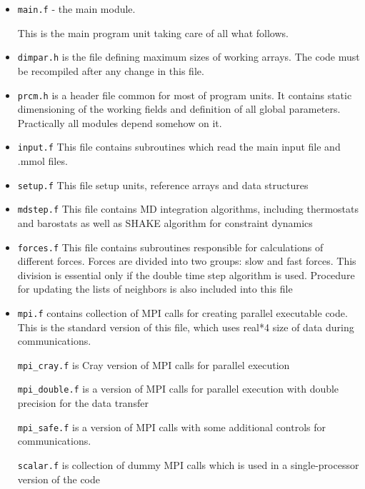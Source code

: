 \documentclass{article}
\begin{document}
\begin{itemize}

\item
\verb|main.f| - the main module.

This is the main program unit taking care of all what follows. 

\item
\verb|dimpar.h| is the file defining maximum sizes of working arrays.
The code must be recompiled after any change in this file.

\item
\verb|prcm.h|  is a header file common for most of program units.
It contains static dimensioning of the working fields and definition of 
all global parameters. Practically all modules depend somehow on it.

\item
\verb|input.f| This file contains subroutines which read
the main input file and .mmol files.

\item
\verb|setup.f| This file setup units, reference arrays and data 
structures 

\item
\verb|mdstep.f| This file contains MD integration algorithms,
including thermostats and barostats as well as SHAKE algorithm for 
constraint dynamics

\item
\verb|forces.f|  
This file contains subroutines responsible for calculations 
of different forces. Forces are divided into two groups:
slow and fast forces. This division is essential only if
the double time step algorithm is used. Procedure for updating 
the lists of neighbors is also included into this file 

\item
\verb|mpi.f| contains collection of MPI calls for creating 
parallel executable code. This is the standard version of this file, 
which uses real*4 size of data during communications.

\verb|mpi_cray.f| is Cray version of MPI calls for parallel 
execution

\verb|mpi_double.f| is a version of MPI calls for parallel 
execution with double precision for the data transfer
 
\verb|mpi_safe.f| is a version of MPI calls with some additional 
controls for communications.

\verb|scalar.f| is collection of dummy MPI calls which is used in a 
single-processor version of the code


\end{itemize}
\end{document}
